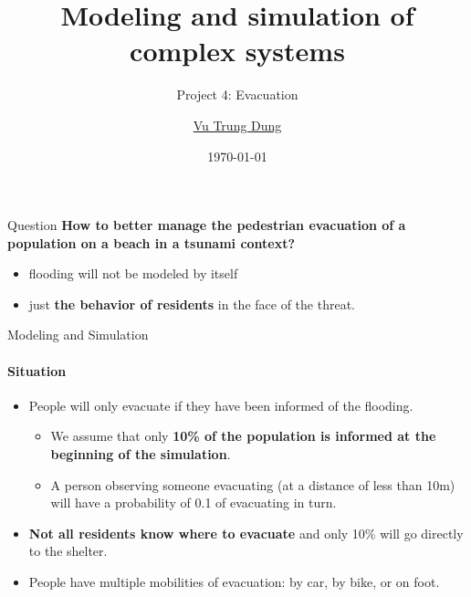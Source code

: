 \documentclass{beamer}
\title{Modeling and simulation of complex systems}
\subtitle{Project 4: Evacuation}
\author{\href{mailto:dungvt2440071@usth.edu.vn}{Vu Trung Dung}}
\date{\today}
\begin{document}
\maketitle
{} %



\begin{frame}[fragile]{Question}
\textbf{How to better manage the pedestrian evacuation of a population on a beach
in a tsunami context?}

\begin{itemize}
\item flooding will not be modeled by itself
\item just \textbf{the behavior of residents} in the face of the threat.
\end{itemize}
\end{frame}


\begin{frame}[fragile]{Modeling and Simulation}
\framesubtitle{Situation}
\begin{itemize}
\item People will only evacuate if they have been informed of the flooding. 
\begin{itemize}
    \item We assume that only \textbf{10\% of the population is informed at the beginning of the simulation}.
    \item A person observing someone evacuating
    (at a distance of less than 10m) will have a probability of 0.1 of evacuating in turn.
\end{itemize}
\item \textbf{Not all residents know where to evacuate} and only 10\% will go directly to the shelter.
\item People have multiple mobilities of evacuation: by car, by bike, or on foot.
\end{itemize}
\end{frame}
\end{document}

